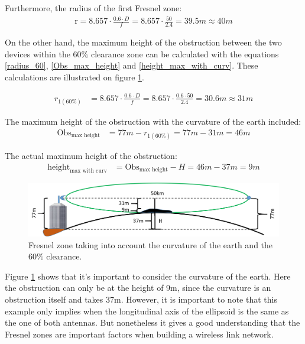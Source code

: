 Furthermore, the radius of the first Fresnel zone:
\begin{align*}
\text{r} = 8.657\cdot \frac{0.6\cdot D}{f} = 8.657\cdot \frac{50}{2.4} = 39.5m \approx 40m 
\end{align*}

On the other hand, the maximum height of the obstruction between the two devices within the 60$\%$ clearance zone can be calculated with the equations \ref{radius_60}, \ref{Obs_max_height} and \ref{height_max_with_curv}. These calculations are illustrated on figure \ref{fig:fresnel_50km_curvature_obstacle}.

\begin{align}
r_{1(60\%)} &= 8.657\cdot \frac{0.6\cdot D}{f} = 8.657\cdot \frac{0.6\cdot 50}{2.4} = 30.6m \approx 31m \label{radius_60}
\end{align}

The maximum height of the obstruction with the curvature of the earth included:
\begin{align}
\text{Obs}_{\text{max height}} &= 77m - r_{1(60\%)} = 77m - 31m = 46m \label{Obs_max_height}
\end{align}

The actual maximum height of the obstruction:
\begin{align}
\text{height}_{\text{max with curv}} &= \text{Obs}_{\text{max height}} - H = 46m - 37m = 9m\label{height_max_with_curv}
\end{align}

\begin{figure}[H]
	\centering
	\includegraphics[scale=0.50]{figures/fresnel_50km_curvature_obstacle.png}
	\caption{Fresnel zone taking into account the curvature of the earth and the 60$\%$ clearance.}
	\label{fig:fresnel_50km_curvature_obstacle}
\end{figure}  

Figure \ref{fig:fresnel_50km_curvature_obstacle} shows that it's important to consider the curvature of the earth. Here the obstruction can only be at the height of 9m, since the curvature is an obstruction itself and takes 37m. However, it is important to note that this example only implies when the longitudinal axis of the ellipsoid is the same as the one of both antennas. But nonetheless it gives a good understanding that the Fresnel zones are important factors when building a wireless link network.
